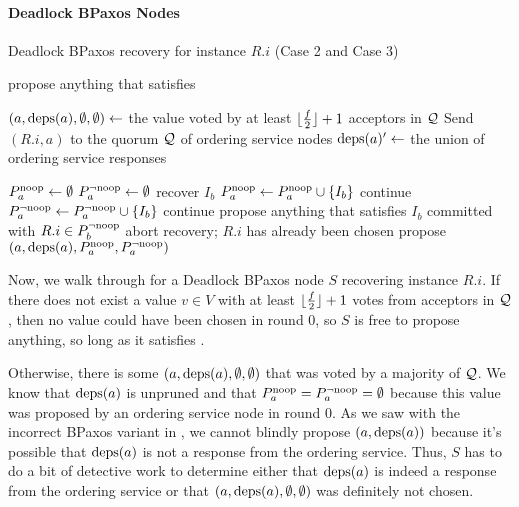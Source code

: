 \paragraph{Deadlock BPaxos Nodes}
\begin{algorithm}[ht]
  \caption{Deadlock BPaxos recovery for instance $R.i$ (Case 2 and Case 3)}%
  \begin{algorithmic}[1]
      \State propose anything that satisfies 
    \EndIf{}

    \State
    \State $(a, \text{deps}(a), \emptyset, \emptyset) \gets$ the value
             voted by at least $\lfloor\frac{f}{2}\rfloor + 1$ acceptors in $\mathcal{Q}$
    \State Send $(R.i, a)$ to the quorum $\mathcal{Q}$ of ordering service nodes
    \State $\text{deps}(a)' \gets$ the union of ordering service responses

    \State
    \State $P^{\text{noop}}_{a} \gets \emptyset$
    \State $P^{\lnot \text{noop}}_{a} \gets \emptyset$
        \State recover $I_b$
      \EndIf
      \State $P^{\text{noop}}_{a} \gets P^{\text{noop}}_{a} \cup \{I_b\}$
        \State continue
      \EndIf{}
        \State $P^{\lnot \text{noop}}_{a} \gets P^{\lnot \text{noop}}_{a} \cup \{I_b\}$
        \State continue
        \State propose anything that satisfies 
      \Else{}
        \State $I_b$ committed with $R.i \in P^{\lnot \text{noop}}_{b}$
        \State abort recovery; $R.i$ has already been chosen
      \EndIf{}
    \EndFor{}
    \State propose $(a, \text{deps}(a), P^{\text{noop}}_{a}, P^{\lnot \text{noop}}_{a})$
  \end{algorithmic}
\end{algorithm}

Now, we walk through  for a Deadlock BPaxos node $S$
recovering instance $R.i$. If there does not exist a value $v \in V$ with at
least $\lfloor\frac{f}{2}\rfloor + 1$ votes from acceptors in $\mathcal{Q}$, then no value
could have been chosen in round $0$, so $S$ is free to propose anything, so
long as it satisfies .

Otherwise, there is some $(a, \text{deps}(a), \emptyset, \emptyset)$ that was voted
by a majority of $\mathcal{Q}$. We know that $\text{deps}(a)$ is unpruned and that
$P^{\text{noop}}_{a} = P^{\lnot \text{noop}}_{a} = \emptyset$ because this value was proposed by an
ordering service node in round $0$.
%
As we saw with the incorrect BPaxos variant in , we
cannot blindly propose $(a, \text{deps}(a))$ because it's possible that $\text{deps}(a)$ is
not a response from the ordering service.  Thus, $S$ has to do a bit of
detective work to determine either that $\text{deps}(a)$ is indeed a response from
the ordering service or that $(a, \text{deps}(a), \emptyset, \emptyset)$ was
definitely not chosen.

